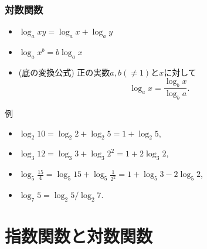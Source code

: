 \begin{frame}
\frametitle{対数関数}   


\begin{Thm}
\begin{itemize}
\item $\log_a xy= \log_a x + \log_a y$
\item $\log_a x^b = b \log_a x$
\item (底の変換公式) 正の実数$a,b(\ne1)$と$x$に対して
$$
\log_a x = \frac{\log_b x}{\log_b a}. 
$$
\end{itemize}
\end{Thm}

例
\begin{itemize}
\item $\log_2 10 = \log_2 2+\log_2 5 =1+ \log_2 5$, 
\item $\log_3 12= \log_3 3 + \log_3 2^2=1+2 \log_3 2$, 
\item $\log_5 \frac{15}{4} = \log_5 15 +\log_5 \frac{1}{2^2} = 1+ \log_5 3 - 2\log_5 2$, 
\item $\log_7 5= \log_2 5 / \log_2 7$. 
\end{itemize}


\end{frame}




\section{指数関数と対数関数}

